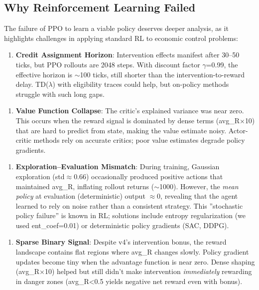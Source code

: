 \documentclass[11pt]{article}
\begin{document}
\subsection{Why Reinforcement Learning Failed}
The failure of PPO to learn a viable policy deserves deeper analysis, as it highlights challenges in applying standard RL to economic control problems:

\begin{enumerate}
\item \textbf{Credit Assignment Horizon}: Intervention effects manifest after 30--50 ticks, but PPO rollouts are 2048 steps. With discount factor $\gamma$=0.99, the effective horizon is $\sim$100 ticks, still shorter than the intervention-to-reward delay. TD($\lambda$) with eligibility traces could help, but on-policy methods struggle with such long gaps.
\end{enumerate}

\begin{enumerate}
\item \textbf{Value Function Collapse}: The critic's explained variance was near zero. This occurs when the reward signal is dominated by dense terms (avg\_R$\times$10) that are hard to predict from state, making the value estimate noisy. Actor-critic methods rely on accurate critics; poor value estimates degrade policy gradients.
\end{enumerate}

\begin{enumerate}
\item \textbf{Exploration--Evaluation Mismatch}: During training, Gaussian exploration (std$\approx$0.66) occasionally produced positive actions that maintained avg\_R, inflating rollout returns ($\sim$1000). However, the \textit{mean policy} at evaluation (deterministic) output $\approx$0, revealing that the agent learned to rely on noise rather than a consistent strategy. This ''stochastic policy failure'' is known in RL; solutions include entropy regularization (we used ent\_coef=0.01) or deterministic policy gradients (SAC, DDPG).
\end{enumerate}

\begin{enumerate}
\item \textbf{Sparse Binary Signal}: Despite v4's intervention bonus, the reward landscape contains flat regions where avg\_R changes slowly. Policy gradient updates become tiny when the advantage function is near zero. Dense shaping (avg\_R$\times$10) helped but still didn't make intervention \textit{immediately} rewarding in danger zones (avg\_R<0.5 yields negative net reward even with bonus).
\end{enumerate}
\end{document}
